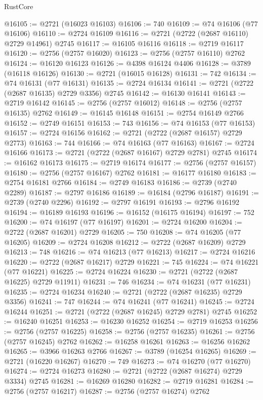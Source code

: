 \begin{lexlean}{RustCore}
\begin{coremodule}
@16105 := @2721 (@16023 @16103)
@16106 := 740
@16109 := @74 @16106 (@77 @16106)
@16110 := @2724 @16109
@16116 := @2721 (@2722 (@2687 @16110) @2729 @14961) @2745
@16117 := @16105 @16116
@16118 := @2719 @16117
@16120 := @2756 (@2757 @16020)
@16123 := @2756 (@2757 @16110) @2762
@16124 := @16120 @16123
@16126 := @4398 @16124 @4406
@16128 := @3789 (@16118 @16126)
@16130 := @2721 (@16015 @16128)
@16131 := 742
@16134 := @74 @16131 (@77 @16131)
@16135 := @2724 @16134
@16141 := @2721 (@2722 (@2687 @16135) @2729 @3356) @2745
@16142 := @16130 @16141
@16143 := @2719 @16142
@16145 := @2756 (@2757 @16012)
@16148 := @2756 (@2757 @16135) @2762
@16149 := @16145 @16148
@16151 := @2754 @16149 @2766
@16152 := @2749 @16151
@16153 := 743
@16156 := @74 @16153 (@77 @16153)
@16157 := @2724 @16156
@16162 := @2721 (@2722 (@2687 @16157) @2729 @2773)
@16163 := 744
@16166 := @74 @16163 (@77 @16163)
@16167 := @2724 @16166
@16173 := @2721 (@2722 (@2687 @16167) @2729 @2781) @2745
@16174 := @16162 @16173
@16175 := @2719 @16174
@16177 := @2756 (@2757 @16157)
@16180 := @2756 (@2757 @16167) @2762
@16181 := @16177 @16180
@16183 := @2754 @16181 @2766
@16184 := @2749 @16183
@16186 := @2739 (@2740 @2289)
@16187 := @2797 @16186
@16189 := @16184 (@2796 @16187)
@16191 := @2739 (@2740 @2296)
@16192 := @2797 @16191
@16193 := @2796 @16192
@16194 := @16189 @16193
@16196 := @16152 (@16175 @16194)
@16197 := 752
@16200 := @74 @16197 (@77 @16197)
@16201 := @2724 @16200
@16204 := @2722 (@2687 @16201) @2729
@16205 := 750
@16208 := @74 @16205 (@77 @16205)
@16209 := @2724 @16208
@16212 := @2722 (@2687 @16209) @2729
@16213 := 748
@16216 := @74 @16213 (@77 @16213)
@16217 := @2724 @16216
@16220 := @2722 (@2687 @16217) @2729
@16221 := 745
@16224 := @74 @16221 (@77 @16221)
@16225 := @2724 @16224
@16230 := @2721 (@2722 (@2687 @16225) @2729 @11911)
@16231 := 746
@16234 := @74 @16231 (@77 @16231)
@16235 := @2724 @16234
@16240 := @2721 (@2722 (@2687 @16235) @2729 @3356)
@16241 := 747
@16244 := @74 @16241 (@77 @16241)
@16245 := @2724 @16244
@16251 := @2721 (@2722 (@2687 @16245) @2729 @2781) @2745
@16252 := @16240 @16251
@16253 := @16230 @16252
@16254 := @2719 @16253
@16256 := @2756 (@2757 @16225)
@16258 := @2756 (@2757 @16235)
@16261 := @2756 (@2757 @16245) @2762
@16262 := @16258 @16261
@16263 := @16256 @16262
@16265 := @3966 @16263 @2766
@16267 := @3789 (@16254 @16265)
@16269 := @2721 (@16220 @16267)
@16270 := 749
@16273 := @74 @16270 (@77 @16270)
@16274 := @2724 @16273
@16280 := @2721 (@2722 (@2687 @16274) @2729 @3334) @2745
@16281 := @16269 @16280
@16282 := @2719 @16281
@16284 := @2756 (@2757 @16217)
@16287 := @2756 (@2757 @16274) @2762

\end{coremodule}
\end{lexlean}
